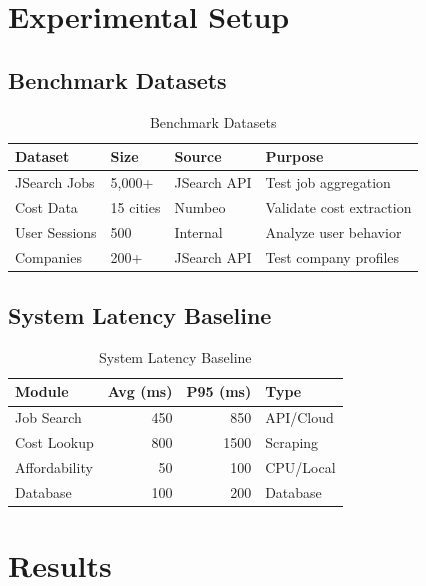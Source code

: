 \section{Experimental Setup}

\subsection{Benchmark Datasets}

\begin{table}[H]
\centering
\caption{Benchmark Datasets}
\label{tab:datasets}
\begin{tabular}{|l|l|l|l|}
\hline
\textbf{Dataset} & \textbf{Size} & \textbf{Source} & \textbf{Purpose} \\
\hline
JSearch Jobs & 5,000+ & JSearch API & Test job aggregation \\
\hline
Cost Data & 15 cities & Numbeo & Validate cost extraction \\
\hline
User Sessions & 500 & Internal & Analyze user behavior \\
\hline
Companies & 200+ & JSearch API & Test company profiles \\
\hline
\end{tabular}
\end{table}

\subsection{System Latency Baseline}

\begin{table}[H]
\centering
\caption{System Latency Baseline}
\label{tab:latency}
\begin{tabular}{|l|r|r|l|}
\hline
\textbf{Module} & \textbf{Avg (ms)} & \textbf{P95 (ms)} & \textbf{Type} \\
\hline
Job Search & 450 & 850 & API/Cloud \\
\hline
Cost Lookup & 800 & 1500 & Scraping \\
\hline
Affordability & 50 & 100 & CPU/Local \\
\hline
Database & 100 & 200 & Database \\
\hline
\end{tabular}
\end{table}

\section{Results}

